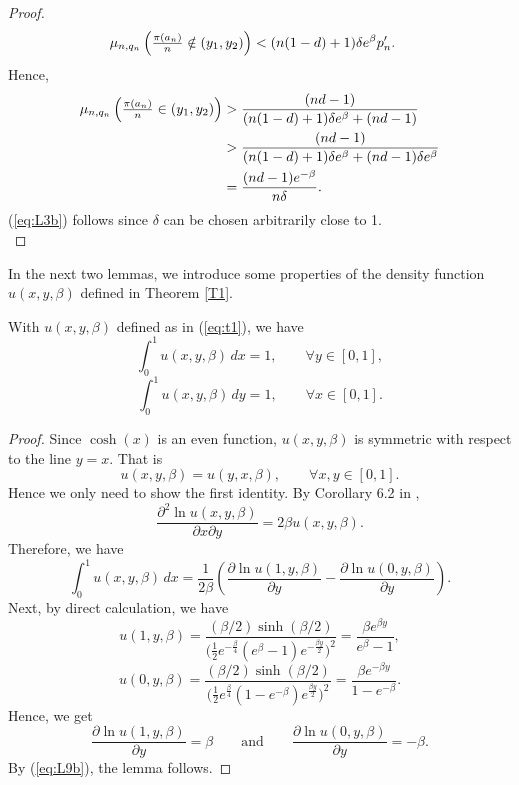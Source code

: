 \begin{proof}
\begin{align*}
\textstyle\mu_{n, q_n} \left(\frac{\pi(a_n)}{n} \notin (y_1, y_2) \right) &< (n(1-d)+1)\delta e^{\beta} p'_n.
\end{align*}
Hence,
\begin{align*}
\textstyle\mu_{n, q_n} \left(\frac{\pi(a_n)}{n} \in (y_1, y_2) \right) &> \frac{(nd-1) }{(n(1-d)+1)\delta e^{\beta} + (nd-1)}\\
 &> \frac{(nd-1) }{(n(1-d)+1)\delta e^{\beta} + (nd-1)\delta e^{\beta}}\\
 &= \frac{(nd-1) e^{-\beta}}{n\delta}.
\end{align*}
(\ref{eq:L3b}) follows since $\delta$ can be chosen arbitrarily close to 1.\\
\end{proof}


In the next two lemmas, we introduce some properties of the density function $u(x, y, \beta)$ defined in Theorem \ref{T1}.

\begin{lemma}\label{L9} %
With $u(x, y, \beta)$ defined as in (\ref{eq:t1}), we have
\[
\int_{0}^{1} u(x, y, \beta) \, dx = 1, \qquad \forall y \in [0, 1],
\]
\[
\int_{0}^{1} u(x, y, \beta) \, dy = 1, \qquad \forall x \in [0, 1].
\]
\end{lemma}
\begin{proof} 
Since $\cosh{(x)}$ is an even function, $u(x, y, \beta)$ is symmetric with respect to the line $y = x$. That is
\[
u(x, y, \beta) = u(y, x, \beta), \qquad \forall x, y \in [0, 1].
\]
Hence we only need to show the first identity. By Corollary 6.2 in \cite{Starr},
\begin{equation}
\frac{\partial^2 \ln{u(x, y, \beta)}}{\partial x \partial y}  = 2 \beta u(x, y, \beta). \label{eq:L9a}
\end{equation}
Therefore, we have
\begin{equation}
\int_{0}^{1} u(x, y, \beta) \, dx =
\frac{1}{2\beta} \left( \frac{\partial \ln{u(1, y, \beta)}}{\partial y} - \frac{\partial \ln{u(0, y, \beta)}}{\partial y} \right).  \label{eq:L9b}
\end{equation}
Next, by direct calculation, we have
\begin{equation}
u(1, y, \beta) = \frac{(\beta/2) \sinh(\beta/2)}{\big( \frac{1}{2}e^{-\frac{\beta}{4}}(e^{\beta}-1)e^{-\frac{\beta y}{2}}\big)^2}=
\frac{\beta e^{\beta y}}{e^{\beta} - 1},  \label{eq:L9c}
\end{equation}
\begin{equation}
u(0, y, \beta) = \frac{(\beta/2) \sinh(\beta/2)}{\big( \frac{1}{2}e^{\frac{\beta}{4}}(1-e^{-\beta})e^{\frac{\beta y}{2}}\big)^2}=
\frac{\beta e^{-\beta y}}{1 - e^{-\beta}}. \label{eq:L9d}
\end{equation}
Hence, we get
\[
\frac{\partial \ln{u(1, y, \beta)}}{\partial y} = \beta \qquad \text{and} \qquad \frac{\partial \ln{u(0, y, \beta)}}{\partial y} = - \beta.
\]
By (\ref{eq:L9b}), the lemma follows.
\end{proof}

